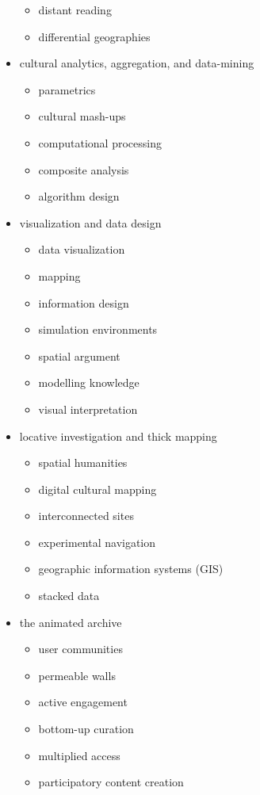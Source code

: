 \begin{itemize}
\begin{itemize}
    \item	distant reading
    \item	differential geographies
  \end{itemize}
  \item cultural analytics, aggregation, and data-mining
  \begin{itemize}
    \item parametrics
    \item	cultural mash-ups
    \item	computational processing
    \item	composite analysis
    \item	algorithm design
  \end{itemize}
  \item visualization and data design
  \begin{itemize}
    \item data visualization
    \item	mapping
    \item	information design
    \item	simulation environments
    \item	spatial argument
    \item	modelling knowledge
    \item	visual interpretation
  \end{itemize}
  \item locative investigation and thick mapping
  \begin{itemize}
    \item spatial humanities
    \item	digital cultural mapping
    \item	interconnected sites
    \item	experimental navigation
    \item	geographic information systems (GIS)
    \item	stacked data
  \end{itemize}
  \item the animated archive
  \begin{itemize}
    \item user communities
    \item	permeable walls
    \item	active engagement
    \item	bottom-up curation
    \item	multiplied access
    \item	participatory content creation

\end{itemize}
\end{itemize}
